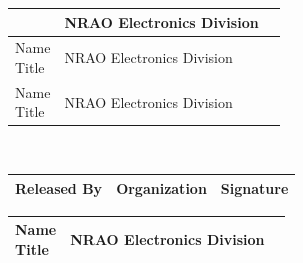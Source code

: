 \documentclass[titlepage]{article}
\renewcommand{\arraystretch}{1.4}
\begin{document}
\begin{center}
\begin{tabular}{|w{l}{3cm}|m{3.5cm}|m{6.93cm}|}
{        } & NRAO Electronics Division \raggedright &  \\ 
        \hline
        \parbox{3cm}{\raggedright
        Name\\Title
        } & NRAO Electronics Division \raggedright &  \\ 
        \hline
        \parbox{3cm}{\raggedright
        Name\\Title
        } & NRAO Electronics Division \raggedright &  \\ 
        \hline
    \end{tabular} \\
    \renewcommand{\arraystretch}{1}
    \vspace*{0.8cm}
    \begin{tabular}{|m{3cm}|m{3.5cm}|m{6.93cm}|} \hline
        \rowcolor{nraoblue}
        \textbf{Released By} & \textbf{Organization} & \textbf{Signature} \\ \hline
    \end{tabular}
    \renewcommand{\arraystretch}{1.5}
    \begin{tabular}{|m{3cm}|m{3.5cm}|m{6.93cm}|} \hline
        \parbox{3cm}{\raggedright
        Name\\Title
        } & NRAO Electronics Division \raggedright &  \\ 
        \hline
    \end{tabular}
    \renewcommand{\arraystretch}{1}
\end{center}

\newpage
\end{document}
